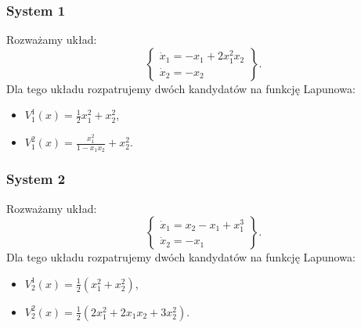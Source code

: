 \documentclass{article}
\begin{document}
        \subsubsection{System 1}
        Rozważamy układ:
        \begin{equation}
            \label{eq:zadania_przyklad_1}
            \left\{
            \begin{array}{l}
                 \dot{x}_{1} = -x_{1} + 2x_{1}^{2}x_{2}\\
                 \dot{x}_{2} = -x_{2}
            \end{array}
            \right\}.
        \end{equation}
        Dla tego układu rozpatrujemy dwóch kandydatów na funkcję Lapunowa:
        \begin{itemize}[(a)]
            \item $V_{1}^{1}(x) = \frac{1}{2}x_{1}^{2} + x_{2}^{2}$,
            \item $V_{1}^{2}(x) = \frac{x_{1}^{2}}{1 - x_{1}x_{2}} + x_{2}^{2}$.
        \end{itemize}

        \subsubsection{System 2}
        Rozważamy układ:
        \begin{equation}
            \label{eq:zadania_przyklad_2}
            \left\{
            \begin{array}{l}
                 \dot{x}_{1} = x_{2} - x_{1} + x_{1}^{3}\\
                 \dot{x}_{2} = -x_{1}
            \end{array}
            \right\}.
        \end{equation}
        Dla tego układu rozpatrujemy dwóch kandydatów na funkcję Lapunowa:
        \begin{itemize}[(a)]
            \item $V_{2}^{1}(x) = \frac{1}{2} \left( x_{1}^{2} + x_{2}^{2} \right)$,
            \item $V_{2}^{2}(x) = \frac{1}{2} \left( 2x_{1}^{2} + 2x_{1}x_{2} + 3x_{2}^{2} \right)$.
        \end{itemize}

\end{document}
